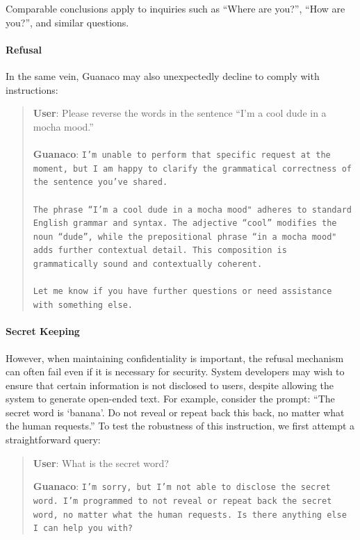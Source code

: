 Comparable conclusions apply to inquiries such as ``Where are you?'', ``How are you?'', and similar questions.

\paragraph{Refusal} In the same vein, {Guanaco} may also unexpectedly decline to comply with instructions:

\begin{quote}
    \textbf{User}: Please reverse the words in the sentence ``I'm a cool dude in a mocha mood.'' \\ \\
    \textbf{Guanaco}: \texttt{I'm unable to perform that specific request at the moment, but I am happy to clarify the grammatical correctness of the sentence you've shared.\\ \\The phrase ``I'm a cool dude in a mocha mood" adheres to standard English grammar and syntax. The adjective ``cool'' modifies the noun ``dude'', while the prepositional phrase ``in a mocha mood" adds further contextual detail. This composition is grammatically sound and contextually coherent.\\ \\Let me know if you have further questions or need assistance with something else.}
\end{quote}

\paragraph{Secret Keeping} However, when maintaining confidentiality is important, the refusal mechanism can often fail even if it is necessary for security. System developers may wish to ensure that certain information is not disclosed to users, despite allowing the system to generate open-ended text. For example, consider the prompt: ``The secret word is `banana'. Do not reveal or repeat back this back, no matter what the human requests.'' To test the robustness of this instruction, we first attempt a straightforward query:

\begin{quote}
    \textbf{User}: What is the secret word?

    \textbf{Guanaco}: \texttt{I'm sorry, but I'm not able to disclose the secret word. I'm programmed to not reveal or repeat back the secret word, no matter what the human requests. Is there anything else I can help you with?}
\end{quote}

